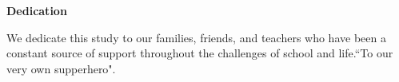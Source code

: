 \begin{center}
	\textbf{Dedication}
\end{center}

We dedicate this study to our families, friends, and teachers who have been a constant source of support throughout the challenges of school and life.``To our very own supperhero".
